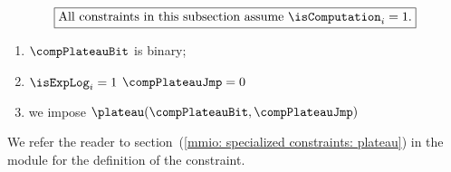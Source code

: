 \[
    \boxed{\text{All constraints in this subsection assume } \isComputation _{i} = 1.}
\]

\begin{enumerate}
    \item $\compPlateauBit$ is binary;
    \item \If $\isExpLog   _{i} = 1$ \Then $\compPlateauJmp = 0$
    \item we impose $\plateau( \compPlateauBit, \compPlateauJmp)$
\end{enumerate}
We refer the reader to section~(\ref{mmio: specialized constraints: plateau}) in the \mmioMod{} module for the definition of the \plateau{} constraint.
